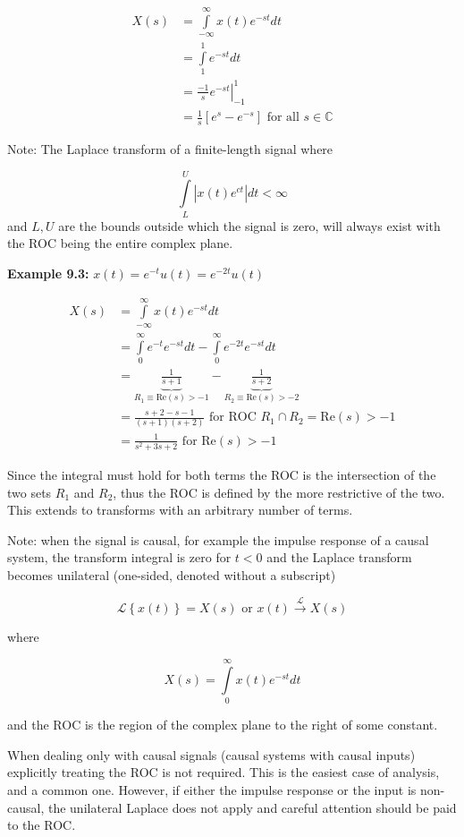 \documentclass{article}
\begin{document}
\begin{align}
  X(s) &= \int\limits_{-\infty}^{\infty} x(t) e^{-st} dt\\
  &= \int\limits_{1}^{1} e^{-st} dt\\
  &= \left. \frac{-1}{s} e^{-st} \right|_{-1}^{1}\\
  &= \frac{1}{s} \left[e^{s} - e^{-s} \right] \text{ for all } s \in\mathbb{C}
\end{align}

Note: The Laplace transform of a finite-length signal where

\[
\int\limits_{L}^{U}\left| x(t)e^{ct} \right| dt < \infty
\]
and $L,U$ are the bounds outside which the signal is zero, will always exist with the ROC being the entire complex plane.

\textbf{Example 9.3:} $x(t) = e^{-t}u(t) = e^{-2t}u(t)$

\begin{align}
  X(s) &= \int\limits_{-\infty}^{\infty} x(t) e^{-st} dt\\
  &= \int\limits_{0}^{\infty} e^{-t} e^{-st} dt - \int\limits_{0}^{\infty} e^{-2t} e^{-st} dt\\
  &= \underbrace{\frac{1}{s+1}}_{R_1 \equiv \text{Re}(s) > -1} - \underbrace{\frac{1}{s+2}}_{R_2 \equiv \text{Re}(s) > -2}\\
  &= \frac{s+2 - s - 1}{(s+1)(s+2)} \text{ for ROC } R_1 \cap R_2 = \text{Re}(s) > -1\\
  &= \frac{1}{s^2 + 3s + 2} \text{ for } \text{Re}(s) > -1
\end{align}

Since the integral must hold for both terms the ROC is the intersection of the two sets $R_1$ and $R_2$, thus the ROC is defined by the more restrictive of the two. This extends to transforms with an arbitrary number of terms.

Note: when the signal is causal, for example the impulse response of a causal system, the transform integral is zero for $t < 0$ and the Laplace transform becomes unilateral (one-sided, denoted without a subscript)

\[
\mathcal{L}\left\{ x(t) \right\} = X(s) \text{ or } x(t) \stackrel{\mathcal{L}}{\longrightarrow} X(s)
\]

where

\[
X(s) = \int\limits_{0}^{\infty} x(t) e^{-st} dt
\]

and the ROC is the region of the complex plane to the right of some constant.

When dealing only with causal signals (causal systems with causal inputs) explicitly treating the ROC is not required. This is the easiest case of analysis, and a common one. However, if either the impulse response or the input is non-causal, the unilateral Laplace does not apply and careful attention should be paid to the ROC.
\end{document}
